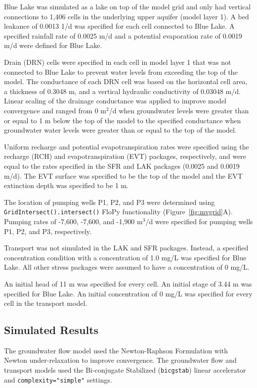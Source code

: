 \documentclass[12pt, oneside]{article}  	%
\begin{document}
Blue Lake was simulated as a lake on top of the model grid and only had vertical connections to 1,406 cells in the underlying upper aquifer (model layer 1). A bed leakance of 0.0013 1/d was specified for each cell connected to Blue Lake. A specified rainfall rate of 0.0025 m/d and a potential evaporation rate of 0.0019 m/d were defined for Blue Lake.

Drain (DRN) cells were specified in each cell in model layer 1 that was not connected to Blue Lake to prevent water levels from exceeding the top of the model. The conductance of each DRN cell was based on the horizontal cell area, a thickness of 0.3048 m, and a vertical hydraulic conductivity of 0.03048 m/d. Linear scaling of the drainage conductance was applied to improve model convergence and ranged from 0 m$^2$/d when groundwater levels were greater than or equal to 1 m below the top of the model to the specified conductance when groundwater water levels were greater than or equal to the top of the model.

Uniform recharge and potential evapotranspiration rates were specified using the recharge (RCH) and evapotranspiration (EVT) packages, respectively, and were equal to the rates specified in the SFR and LAK packages (0.0025 and 0.0019 m/d). The EVT surface was specified to be the top of the model and the EVT extinction depth was specified to be 1 m.

The location of pumping wells P1, P2, and P3 were determined using \texttt{GridIntersect().intersect()} FloPy functionality (Figure~\ref{fig:mvgrid}A). Pumping rates of -7,600, -7,600, and -1,900 m$^3$/d were specified for pumping wells P1, P2, and P3, respectively.

Transport was not simulated in the LAK and SFR packages. Instead, a specified concentration condition with a concentration of 1.0 mg/L was specified for Blue Lake. All other stress packages were assumed to have a concentration of 0 mg/L.

An initial head of 11 m was specified for every cell. An initial stage of 3.44 m was specified for Blue Lake. An initial concentration of 0 mg/L was specified for every cell in the transport model.

\subsection*{Simulated Results}
The groundwater flow model used the Newton-Raphson Formulation with Newton under-relaxation to improve convergence. The groundwater flow and transport models used the Bi-conjugate Stabilized (\texttt{bicgstab}) linear accelerator and \texttt{complexity="simple"} settings.
 
\end{document}
